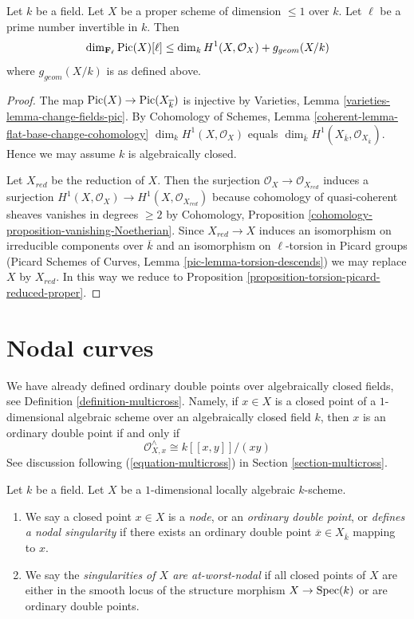 \begin{lemma}
\label{lemma-bound-torsion-simple}
Let $k$ be a field. Let $X$ be a proper scheme of dimension $\leq 1$ over $k$.
Let $\ell$ be a prime number invertible in $k$. Then
$$
\dim_{\mathbf{F}_\ell} \mathop{\mathrm{Pic}}\nolimits(X)[\ell] \leq
\dim_k H^1(X, \mathcal{O}_X) + g_{geom}(X/k)
$$
where $g_{geom}(X/k)$ is as defined above.
\end{lemma}

\begin{proof}
The map $\mathop{\mathrm{Pic}}\nolimits(X) \to \mathop{\mathrm{Pic}}\nolimits(X_{\overline{k}})$
is injective by Varieties, Lemma \ref{varieties-lemma-change-fields-pic}.
By Cohomology of Schemes, Lemma \ref{coherent-lemma-flat-base-change-cohomology}
$\dim_k H^1(X, \mathcal{O}_X)$ equals
$\dim_{\overline{k}} H^1(X_{\overline{k}}, \mathcal{O}_{X_{\overline{k}}})$.
Hence we may assume $k$ is algebraically closed.

\medskip\noindent
Let $X_{red}$ be the reduction of $X$. Then the surjection
$\mathcal{O}_X \to \mathcal{O}_{X_{red}}$ induces a surjection
$H^1(X, \mathcal{O}_X) \to H^1(X, \mathcal{O}_{X_{red}})$
because cohomology of quasi-coherent sheaves vanishes in degrees
$\geq 2$ by
Cohomology, Proposition \ref{cohomology-proposition-vanishing-Noetherian}.
Since $X_{red} \to X$ induces an isomorphism on irreducible
components over $\overline{k}$ and an isomorphism on
$\ell$-torsion in Picard groups
(Picard Schemes of Curves, Lemma \ref{pic-lemma-torsion-descends})
we may replace $X$ by $X_{red}$. In this way we reduce to
Proposition \ref{proposition-torsion-picard-reduced-proper}.
\end{proof}






\section{Nodal curves}
\label{section-nodal}

\noindent
We have already defined ordinary double points over algebraically
closed fields, see Definition \ref{definition-multicross}. Namely,
if $x \in X$ is a closed point of a $1$-dimensional
algebraic scheme over an algebraically closed field $k$, then
$x$ is an ordinary double point if and only if
$$
\mathcal{O}_{X, x}^\wedge \cong k[[x, y]]/(xy)
$$
See discussion following (\ref{equation-multicross}) in
Section \ref{section-multicross}.

\begin{definition}
\label{definition-nodal}
Let $k$ be a field. Let $X$ be a $1$-dimensional locally algebraic $k$-scheme.
\begin{enumerate}
\item We say a closed point $x \in X$ is a {\it node}, or an
{\it ordinary double point}, or {\it defines a nodal singularity}
if there exists an ordinary double point $\overline{x} \in X_{\overline{k}}$
mapping to $x$.
\item We say the {\it singularities of $X$ are at-worst-nodal} if
all closed points of $X$ are either in the smooth locus of
the structure morphism $X \to \mathop{\mathrm{Spec}}(k)$ or are ordinary double points.
\end{enumerate}
\end{definition}

